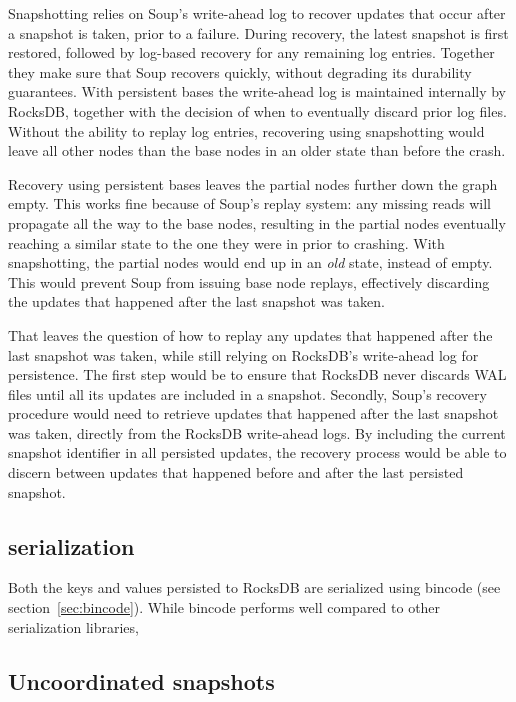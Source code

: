 Snapshotting relies on Soup's write-ahead log to recover updates that occur
after a snapshot is taken, prior to a failure. During recovery, the latest
snapshot is first restored, followed by log-based recovery for any remaining log
entries. Together they make sure that Soup recovers quickly, without degrading
its durability guarantees. With persistent bases the write-ahead log is
maintained internally by RocksDB, together with the decision of when to
eventually discard prior log files. Without the ability to replay log entries,
recovering using snapshotting would leave all other nodes than the base nodes in
an older state than before the crash.

Recovery using persistent bases leaves the partial nodes further down the graph
empty. This works fine because of Soup's replay system: any missing reads will
propagate all the way to the base nodes, resulting in the partial nodes
eventually reaching a similar state to the one they were in prior to crashing.
With snapshotting, the partial nodes would end up in an \textit{old} state,
instead of empty. This would prevent Soup from issuing base node replays,
effectively discarding the updates that happened after the last snapshot was
taken.

That leaves the question of how to replay any updates that happened after the
last snapshot was taken, while still relying on RocksDB's write-ahead log for
persistence. The first step would be to ensure that RocksDB never discards WAL
files until all its updates are included in a snapshot. Secondly, Soup's
recovery procedure would need to retrieve updates that happened after the last
snapshot was taken, directly from the RocksDB write-ahead logs. By including the
current snapshot identifier in all persisted updates, the recovery process would
be able to discern between updates that happened before and after the last
persisted snapshot.

\subsection{ serialization}

Both the keys and values persisted to RocksDB are serialized using
bincode (see section~\ref{sec:bincode}). While bincode performs well
compared to other serialization libraries,

\subsection{Uncoordinated snapshots}

